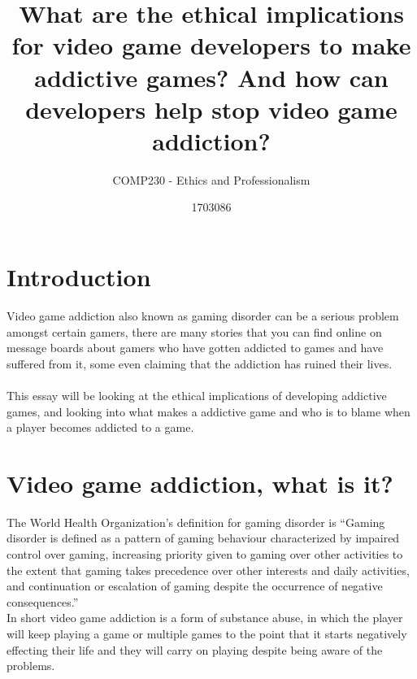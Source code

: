 \documentclass{scrartcl}
\title{What are the ethical implications for video game developers to make addictive games? And how can developers help stop video game addiction?}
\subtitle{COMP230 - Ethics and Professionalism}
\author{1703086}
\begin{document}
\maketitle


\section{Introduction}
Video game addiction also known as gaming disorder can be a serious problem amongst certain gamers, there are many stories that you can find online on message boards about gamers who have gotten addicted to games and have suffered from it, some even claiming that the addiction has ruined their lives.
\\
\\
This essay will be looking at the ethical implications of developing addictive games, and looking into what makes a addictive game and who is to blame when a player becomes addicted to a game.  

\section{Video game addiction, what is it?}
The World Health Organization's definition for gaming disorder is “Gaming disorder is defined as a pattern of gaming behaviour characterized by impaired control over gaming, increasing priority given to gaming over other activities to the extent that gaming takes precedence over other interests and daily activities, and continuation or escalation of gaming despite the occurrence of negative consequences.”
\\
In short video game addiction is a form of substance abuse, in which the player will keep playing a game or multiple games to the point that it starts negatively effecting their life and they will carry on playing despite being aware of the problems.\cite{Addiction1, Addiction2}
\end{document}
